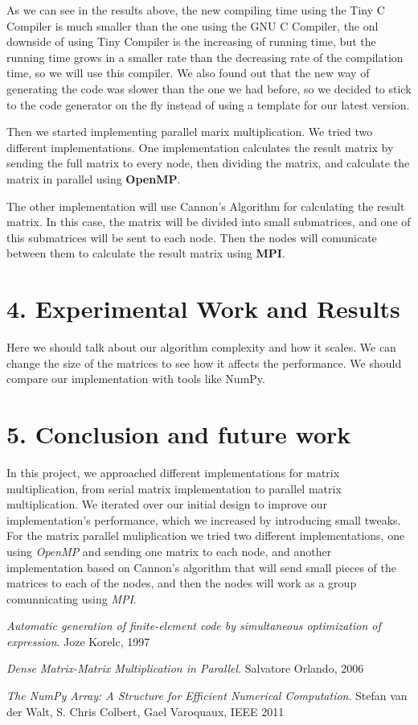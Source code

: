 \documentclass{article}
\begin{document}
As we can see in the results above, the new compiling time using the Tiny C Compiler is much smaller than the one using the GNU C Compiler, the onl downside of using Tiny Compiler is the increasing of running time, but the running time grows in a smaller rate than the decreasing rate of the compilation time, so we will use this compiler. We also found out that the new way of generating the code was slower than the one we had before, so we decided to stick to the code generator on the fly instead of using a template for our latest version.

Then we started implementing parallel marix multiplication. We tried two different implementations. One implementation calculates the result matrix by sending the full matrix to every node, then dividing the matrix, and calculate the matrix in parallel using \textbf{OpenMP}.

The other implementation will use Cannon's Algorithm for calculating the result matrix. In this case, the matrix will be divided into small submatrices, and one of this submatrices will be sent to each node. Then the nodes will comunicate between them to calculate the result matrix using \textbf{MPI}.

\section*{4. Experimental Work and Results}

Here we should talk about our algorithm complexity and how it scales. We can change the size of the matrices to see how it affects the performance. We should compare our implementation with tools like NumPy.

\section*{5. Conclusion and future work}

In this project, we approached different implementations for matrix multiplication, from serial matrix implementation to parallel matrix multiplication. We iterated over our initial design to improve our implementation's performance, which we increased by introducing small tweaks. For the matrix parallel muliplication we tried two different implementations, one using \textit{OpenMP} and sending one matrix to each node, and another implementation based on Cannon's algorithm that will send small pieces of the matrices to each of the nodes, and then the nodes will work as a group comunnicating using \textit{MPI}.

\begin{thebibliography}{9}
\textit{Automatic generation of finite-element code by simultaneous optimization of expression}. Joze Korelc, 1997

\textit{Dense Matrix-Matrix Multiplication in Parallel}. Salvatore Orlando, 2006

\textit{The NumPy Array: A Structure for Efficient Numerical Computation}.  Stefan van der Walt, S. Chris Colbert, Gael Varoquaux, IEEE 2011

\end{thebibliography}
\end{document}
